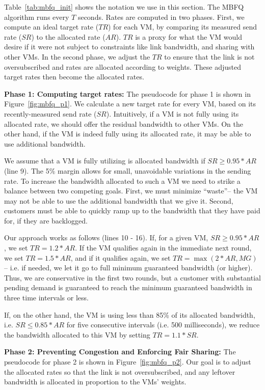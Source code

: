 Table~\ref{tab:mbfq_init} shows the notation we use in this section.  The MBFQ
algorithm runs every $T$ seconds. Rates are computed in two phases.  First, we
compute an ideal target rate ($TR$) for each VM, by comparing its measured send
rate ($SR$) to the allocated rate ($AR$). $TR$ is a proxy for what the VM would
desire if it were not subject to constraints like link bandwidth, and sharing
with other VMs.  In the second phase, we adjust the $TR$ to ensure that the link
is not oversubscribed and rates are allocated according to weights. These
adjusted target rates then become the allocated rates.

{\bf Phase 1: Computing target rates:} 
The pseudocode for phase 1 is shown in Figure~\ref{fig:mbfq_p1}. We calculate
a new target rate for every VM, based on its recently-measured send rate ($SR$).
Intuitively, if a VM is not fully using its allocated rate, we should offer the
residual bandwidth to other VMs.  On the other hand, if the VM is indeed fully
using its allocated rate, it may be able to use additional bandwidth. 

We assume that a VM is fully utilizing is allocated bandwidth if $SR \geq
0.95*AR$ (line 9). The 5\% margin allows for small, unavoidable variations in
the sending rate. To increase the bandwidth allocated to such a VM we need to
strike a balance between two competing goals. First, we must minimize
``waste''-- the VM may not be able to use the additional bandwidth that we give
it.  Second, customers must be able to quickly ramp up to the bandwidth that
they have paid for, if they are backlogged.

Our approach works as follows (lines 10 - 16).  If, for a given VM, $SR \geq
0.95*AR$, we set $TR = 1.2*AR$.  If the VM qualifies again in the immediate next
round, we set $TR = 1.5*AR$, and if it qualifies again, we set $TR = \max(2*AR,
MG)$ -- i.e.  if needed, we let it go to full minimum guaranteed bandwidth (or
higher).  Thus, we are conservative in the first two rounds, but a customer with
substantial pending demand is guaranteed to reach the minimum guaranteed
bandwidth in three time intervals or less.

If, on the other hand, the VM is using less than 85\% of its allocated
bandwidth, i.e. $SR \leq 0.85*AR$ for five consecutive intervals (i.e. 500 milliseconds),
we reduce the bandwidth allocated to this VM by setting $TR = 1.1*SR$. 

{\bf Phase 2:  Preventing Congestion and Enforcing Fair Sharing:} The pseudocode
for phase 2 is shown in Figure~\ref{fig:mbfq_p2}. Our goal is to adjust the
allocated rates so that the link is not oversubscribed, and any leftover bandwidth
is allocated in proportion to the VMs' weights.

